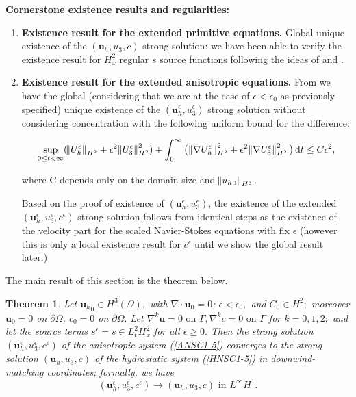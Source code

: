 \documentclass[11pt]{article}
\newtheorem{theorem}{Theorem}
\newcommand*\diff{\mathop{}\!\mathrm{d}}
\begin{document}
\textbf{Cornerstone existence results and regularities:}

\begin{enumerate}

  \item \textbf{Existence result for the extended primitive equations.} Global unique existence of the $(\mathbf{u}_h, u_3, c)$ strong solution: we have been able to verify the existence result for $H^2_x$ regular $s$ source functions following the ideas of \cite{cao2014local} and \cite{cao2012global}.

  \item \textbf{Existence result for the extended anisotropic equations.} From \cite{li2019primitive} we have the global (considering that we are at the case of $\epsilon < \epsilon_0$ as previously specified) unique existence of the $(\mathbf{u}_h^\epsilon, u_3^\epsilon)$ strong solution without considering concentration with the following uniform bound for the difference:
  
  \[ \sup_{0 \leq t < \infty} (\norm{U_h^\epsilon}_{H^2} + \epsilon^2 \norm{U_3^\epsilon}_{H^2}^2) + \int_0^\infty \big( \norm{\nabla U_h^\epsilon}_{H^2}^2 + \epsilon^2 \norm{\nabla U_3^\epsilon}_{H^2}^2 \big) \diff t \leq C \epsilon^2,\]
  
  where C depends only on the domain size and $\norm{{u_h}_0}_{H^3}.$
  
Based on the proof of existence of $(\mathbf{u}_h^\epsilon, u_3^\epsilon)$, the existence of the extended $(\mathbf{u}_h^\epsilon, u_3^\epsilon, c^\epsilon)$ strong solution follows from identical steps as the existence of the velocity part for the scaled Navier-Stokes equations with fix $\epsilon$ (however this is only a local existence result for $c^\epsilon$ until we show the global result later.)

\end{enumerate}

The main result of this section is the theorem below.

\begin{theorem}
Let ${\mathbf{u}_h}_0 \in H^3(\Omega),$ with $\nabla \cdot \mathbf{u}_0 = 0$; $\epsilon < \epsilon_0,$ and $C_0 \in H^2;$ moreover $\mathbf{u}_0 = 0$ on $\partial \Omega$, $c_0 = 0$ on $\partial \Omega.$ Let $\nabla^k \mathbf{u} = 0 \text{ on } \Gamma, \nabla^k c = 0  \text{ on } \Gamma$ for $k= 0,1,2;$ and let the source terms $s^\epsilon = s \in L^2_t H^2_x$ for all $\epsilon \geq 0.$ Then the strong solution $(\mathbf{u}_h^\epsilon, u_3^\epsilon, c^\epsilon)$ of the anisotropic system (\ref{ANSC1-5}) converges to the strong solution $(\mathbf{u}_h, u_3, c)$ of the hydrostatic system (\ref{HNSC1-5}) in downwind-matching coordinates; formally, we have
$$(\mathbf{u}_h^\epsilon, u_3^\epsilon, c^\epsilon) \to (\mathbf{u}_h, u_3, c) \text{ in } L^\infty H^1.$$
\end{theorem}
\end{document}
